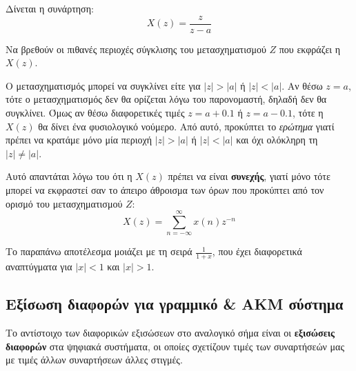 \documentclass[11pt,a4paper,notitlepage,fleqn]{article}
\begin{document}

\begin{exercise}
	Δίνεται η συνάρτηση:
	\[
	X(z) = \frac{z}{z-a}
	\]
	
	Να βρεθούν οι πιθανές περιοχές σύγκλισης του μετασχηματισμού \( Z \) που εκφράζει η \( X(z) \).
	\tcblower
	
	\saveparinfo
	\begin{minipage}{.7\textwidth}
		\useparinfo
	Ο μετασχηματισμός μπορεί να συγκλίνει είτε για \( |z|>|a| \) ή \( |z|<|a| \). Αν θέσω
	\( z=a \), τότε ο μετασχηματισμός δεν θα ορίζεται λόγω του παρονομαστή, δηλαδή δεν θα συγκλίνει.
	Όμως αν θέσω διαφορετικές τιμές \( z=a+0.1 \) ή \( z=a-0.1 \), τότε η \( X(z) \) θα δίνει ένα
	φυσιολογικό νούμερο. Από αυτό, προκύπτει το \emph{ερώτημα} γιατί πρέπει να κρατάμε μόνο μία περιοχή
	\( |z|>|a| \) ή \( |z|<|a| \) και όχι ολόκληρη τη \( |z|\neq|a| \).
\end{minipage}
	\begin{minipage}{.3\textwidth}
		\begin{center}
		\end{center}
	\end{minipage}
	
	Αυτό απαντάται λόγω του ότι η \( X(z) \) πρέπει να είναι \textbf{συνεχής}, γιατί μόνο τότε
	μπορεί να εκφραστεί σαν το άπειρο άθροισμα των όρων που προκύπτει από τον ορισμό του
	μετασχηματισμού \( Z \):\[
	X(z) = \sum_{n=-\infty}^{\infty} x(n)z^{-n}
	\]
	
	Το παραπάνω αποτέλεσμα μοιάζει με τη σειρά \( \frac{1}{1+x} \), που έχει διαφορετικά αναπτύγματα για
	\( |x|<1 \) και \( |x|>1 \).
\end{exercise}

\subsection{Εξίσωση διαφορών για γραμμικό \& ΑΚΜ σύστημα}
Το αντίστοιχο των διαφορικών εξισώσεων στο αναλογικό σήμα είναι οι \textbf{εξισώσεις διαφορών} στα
ψηφιακά συστήματα, οι οποίες σχετίζουν τιμές των συναρτήσεών μας με τιμές άλλων συναρτήσεων άλλες στιγμές.
\end{document}
